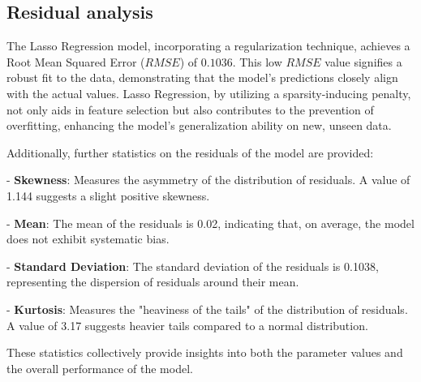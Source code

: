 \documentclass[10pt]{article} %
\begin{document}
    \subsection{Residual analysis}

    The Lasso Regression model, incorporating a regularization technique, achieves a Root Mean Squared Error ($RMSE$) of $0.1036$. This low $RMSE$ value signifies a robust fit to the data, demonstrating that the model's predictions closely align with the actual values. Lasso Regression, by utilizing a sparsity-inducing penalty, not only aids in feature selection but also contributes to the prevention of overfitting, enhancing the model's generalization ability on new, unseen data.
    
    Additionally, further statistics on the residuals of the model are provided:
    
    - \textbf{Skewness}: Measures the asymmetry of the distribution of residuals. A value of 1.144 suggests a slight positive skewness.
    
    - \textbf{Mean}: The mean of the residuals is 0.02, indicating that, on average, the model does not exhibit systematic bias.
    
    - \textbf{Standard Deviation}: The standard deviation of the residuals is 0.1038, representing the dispersion of residuals around their mean.
    
    - \textbf{Kurtosis}: Measures the "heaviness of the tails" of the distribution of residuals. A value of 3.17 suggests heavier tails compared to a normal distribution.
    
    These statistics collectively provide insights into both the parameter values and the overall performance of the model.
    
\end{document}
